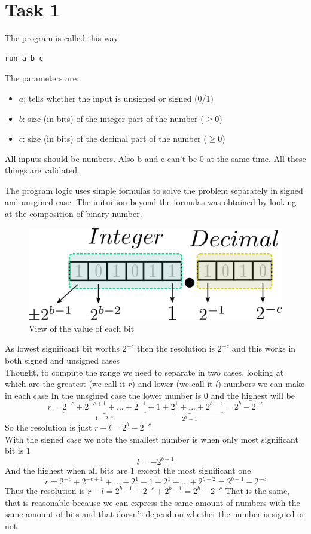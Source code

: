 
\usepackage{listings}



\section*{Task 1}

The program is called this way

\begin{lstlisting}
run a b c
\end{lstlisting}

The parameters are:
\begin{itemize}
  \item $a$: tells whether the input is unsigned or signed (0/1)
  \item $b$: size (in bits) of the integer part of the number ($\geq0$)
  \item $c$: size (in bits) of the decimal part of the number ($\geq0$)
\end{itemize}
All inputs should be numbers. Also b and c can't be 0 at the same time.
All these things are validated.

The program logic uses simple formulas to solve the problem separately in signed and unsgined case.
The inituition beyond the formulas was obtained by looking at the composition of binary number.
\begin{figure}[H]
  \begin{centering}
  \includegraphics[scale=1]{bits.png}
  \par\end{centering}
  \caption{View of the value of each bit}
\end{figure}
As lowest significant bit worths $2^{-c}$ then the resolution is $2^{-c}$ and this works in both signed and unsigned cases
\\
Thought, to compute the range we need to separate in two cases, looking at which are the greatest (we call it $r$) and lower (we call it $l$) numbers we can make in each case
In the unsgined case the lower number is 0 and the highest will be
$$r=\underbrace{2^{-c}+2^{-c+1}+...+2^{-1}}_{1-2^{-c}}+\underbrace{1+2^{1}+...+2^{b-1}}_{2^{b}-1}=2^{b}-2^{-c}$$
So the resolution is just $r-l=2^{b}-2^{-c}$
\\
With the signed case we note the smallest number is when only most significant bit is 1
$$l=-2^{b-1} $$
And the highest when all bits are 1 except the most significant one
$$r=2^{-c}+2^{-c+1}+...+2^{1}+1+2^{1}+...+2^{b-2}=2^{b-1}-2^{-c}$$
Thus the resolution is $r-l=2^{b-1}-2^{-c}+2^{b-1}=2^{b}-2^{-c}$
That is the same, that is reasonable because we can express the same amount of numbers with the same amount of bits and that doesn't depend on whether the number is signed or not

